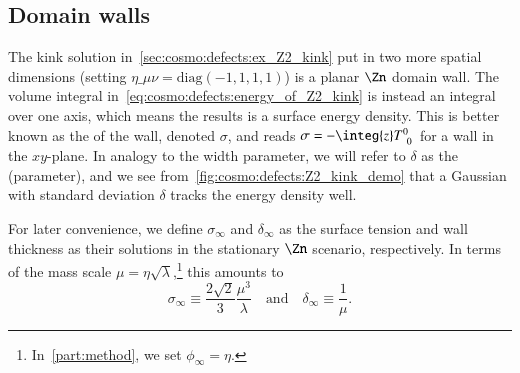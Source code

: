 \subsection{Domain walls}\label{sec:cosmo:defects:dws}
    The kink solution in~\cref{sec:cosmo:defects:ex_Z2_kink} put in two more spatial dimensions (setting $\eta\_{\mu\nu}=\text{diag}(-1,1,1,1)$) is a planar $\Zn$ domain wall. 
    The volume integral in~\cref{eq:cosmo:defects:energy_of_Z2_kink} is instead an integral over one axis, which means the results is a surface energy density. This is better known as the  of the wall, denoted $\sigma$, and reads $\sigma = -\integ{z} T\indices{^0_0}$ for a wall in the $xy$-plane. %
    In analogy to the width parameter, we will refer to $\delta$ as the  (parameter), and we see from~\cref{fig:cosmo:defects:Z2_kink_demo} that a Gaussian with standard deviation $\delta$ tracks the energy density well.
    
    For later convenience, we define $\sigma_\infty$ and $\delta_\infty$ as the surface tension and wall thickness as their solutions in the stationary $\Zn$ scenario, respectively. In terms of the mass scale $\mu=\eta\sqrt{\lambda}$,\footnote{In~\cref{part:method}, we set $\phi_\infty = \eta$.} this amounts to
    \begin{equation}\label{eq:cosmo:defects:sigma_delta_inf}
        \sigma_\infty \equiv \frac{2\sqrt{2 }}{3} \frac{\mu^3}{\lambda} \quad\text{and}\quad \delta_\infty \equiv \frac{1}{\mu}.
    \end{equation}
    

